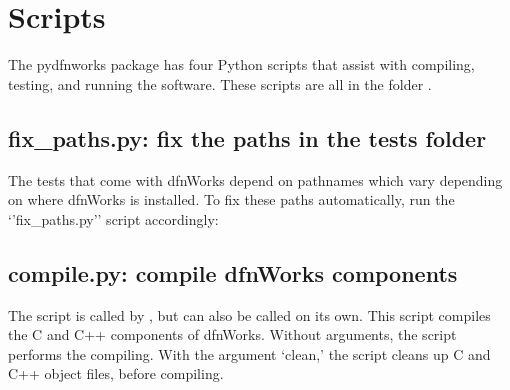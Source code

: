 \documentclass[letterpaper,10pt,english]{sphinxmanual}
\begin{document}
\begin{sphinxVerbatim}[commandchars=\\\{\}]
 

 

 

 

\end{sphinxVerbatim}


\chapter{Scripts}
\label{\detokenize{scripts:scripts}}\label{\detokenize{scripts::doc}}\label{\detokenize{scripts:scripts-chapter}}
The pydfnworks package has four Python scripts that assist with compiling, testing, and running the software. These scripts are all in the folder  .


\section{fix\_paths.py: fix the paths in the tests folder}
\label{\detokenize{scripts:fix-paths-py-fix-the-paths-in-the-tests-folder}}
The tests that come with dfnWorks depend on pathnames which vary depending on where dfnWorks is installed. To fix these paths automatically, run the ‘’fix\_paths.py’’ script accordingly:



\section{compile.py: compile dfnWorks components}
\label{\detokenize{scripts:compile-py-compile-dfnworks-components}}
The  script is called by , but can also be called on its own. This script compiles the C and C++ components of dfnWorks. Without arguments, the script performs the compiling. With the argument ‘clean,’ the script cleans up C and C++ object files, before compiling.
\end{document}
